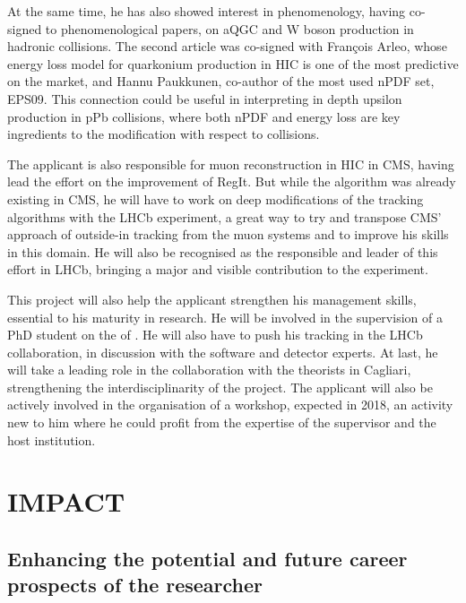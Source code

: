 \documentclass[a4paper,11pt]{article}
\begin{document}
At the same time, he has also showed interest in phenomenology, having co-signed to phenomenological papers, on aQGC and W boson production in hadronic collisions. The second article was co-signed with François Arleo, whose energy loss model for quarkonium production in HIC is one of the most predictive on the market, and Hannu Paukkunen, co-author of the most used nPDF set, EPS09. This connection could be useful in interpreting in depth upsilon production in pPb collisions, where both nPDF and energy loss are key ingredients to the modification with respect to \pp collisions.

The applicant is also responsible for muon reconstruction in HIC in CMS, having lead the effort on the improvement of RegIt. But while the algorithm was already existing in CMS, he will have to work on deep modifications of the tracking algorithms with the LHCb experiment, a great way to try and transpose CMS' approach of outside-in tracking from the muon systems and to improve his skills in this domain. He will also be recognised as the responsible and leader of this effort in LHCb, bringing a major and visible contribution to the experiment.

This project will also help the applicant strengthen his management skills, essential to his maturity in research. He will be involved in the supervision of a PhD student on the \rpa of \PgUabc. He will also have to push his \pbpb tracking in the LHCb collaboration, in discussion with the software and detector experts. At last, he will 
take a leading role in the collaboration with the theorists in Cagliari, strengthening the interdisciplinarity of the project. The applicant will also be actively involved in the organisation of a workshop, expected in 2018, an activity new to him where he could profit from the expertise of the supervisor and the host institution.

%           

\section{IMPACT}
\label{sec:impact}

%               

\subsection{Enhancing the potential and future career prospects of the researcher }
\label{sec:enhancement}
\end{document}
